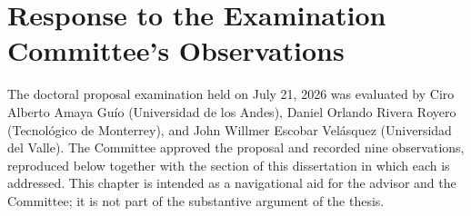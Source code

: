 \documentclass[12pt,a4paper]{report}
\begin{document}
\newpage
\tableofcontents
\newpage

\chapter*{Response to the Examination Committee's Observations}
\label{ch:response}

The doctoral proposal examination held on July 21, 2026 was evaluated by Ciro Alberto Amaya Gu\'{i}o (Universidad de los Andes), Daniel Orlando Rivera Royero (Tecnol\'{o}gico de Monterrey), and John Willmer Escobar Vel\'{a}squez (Universidad del Valle). The Committee approved the proposal and recorded nine observations, reproduced below together with the section of this dissertation in which each is addressed. This chapter is intended as a navigational aid for the advisor and the Committee; it is not part of the substantive argument of the thesis.
\end{document}

